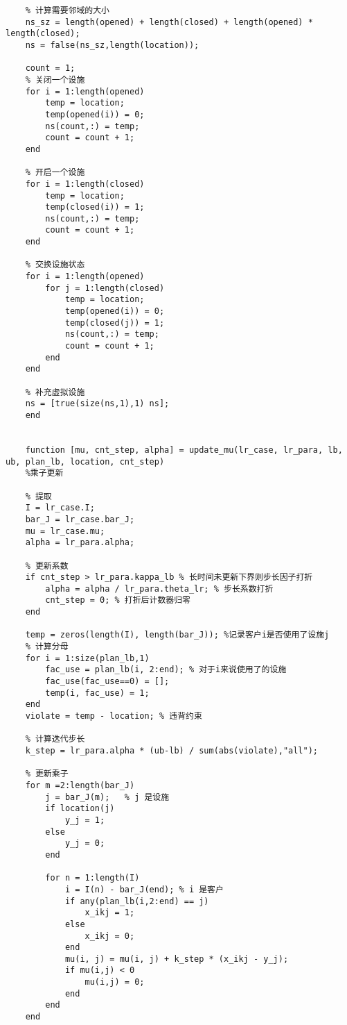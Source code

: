 {\begin{lstlisting}
    % 计算需要邻域的大小
    ns_sz = length(opened) + length(closed) + length(opened) * length(closed);
    ns = false(ns_sz,length(location));

    count = 1;
    % 关闭一个设施
    for i = 1:length(opened)
        temp = location;
        temp(opened(i)) = 0;
        ns(count,:) = temp;
        count = count + 1;
    end

    % 开启一个设施
    for i = 1:length(closed)
        temp = location;
        temp(closed(i)) = 1;
        ns(count,:) = temp;
        count = count + 1;
    end

    % 交换设施状态
    for i = 1:length(opened)
        for j = 1:length(closed)
            temp = location;
            temp(opened(i)) = 0;
            temp(closed(j)) = 1;
            ns(count,:) = temp;
            count = count + 1;
        end
    end

    % 补充虚拟设施
    ns = [true(size(ns,1),1) ns];
    end


    function [mu, cnt_step, alpha] = update_mu(lr_case, lr_para, lb, ub, plan_lb, location, cnt_step)
    %乘子更新

    % 提取
    I = lr_case.I;
    bar_J = lr_case.bar_J;
    mu = lr_case.mu;
    alpha = lr_para.alpha;

    % 更新系数
    if cnt_step > lr_para.kappa_lb % 长时间未更新下界则步长因子打折
        alpha = alpha / lr_para.theta_lr; % 步长系数打折
        cnt_step = 0; % 打折后计数器归零
    end

    temp = zeros(length(I), length(bar_J)); %记录客户i是否使用了设施j
    % 计算分母
    for i = 1:size(plan_lb,1)
        fac_use = plan_lb(i, 2:end); % 对于i来说使用了的设施
        fac_use(fac_use==0) = [];
        temp(i, fac_use) = 1;
    end
    violate = temp - location; % 违背约束

    % 计算迭代步长
    k_step = lr_para.alpha * (ub-lb) / sum(abs(violate),"all");

    % 更新乘子
    for m =2:length(bar_J)
        j = bar_J(m);   % j 是设施
        if location(j)
            y_j = 1;
        else
            y_j = 0;
        end

        for n = 1:length(I)
            i = I(n) - bar_J(end); % i 是客户
            if any(plan_lb(i,2:end) == j)
                x_ikj = 1;
            else
                x_ikj = 0;
            end
            mu(i, j) = mu(i, j) + k_step * (x_ikj - y_j);
            if mu(i,j) < 0
                mu(i,j) = 0;
            end
        end
    end



\end{lstlisting}}

